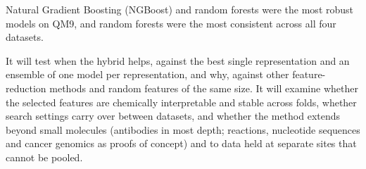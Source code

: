Natural Gradient Boosting (NGBoost) and random forests were the most robust models on QM9, and random forests were the most consistent across all four datasets.

It will test when the hybrid helps, against the best single representation and an ensemble of one model per representation, and why, against other feature-reduction methods and random features of the same size. It will examine whether the selected features are chemically interpretable and stable across folds, whether search settings carry over between datasets, and whether the method extends beyond small molecules (antibodies in most depth; reactions, nucleotide sequences and cancer genomics as proofs of concept) and to data held at separate sites that cannot be pooled.
